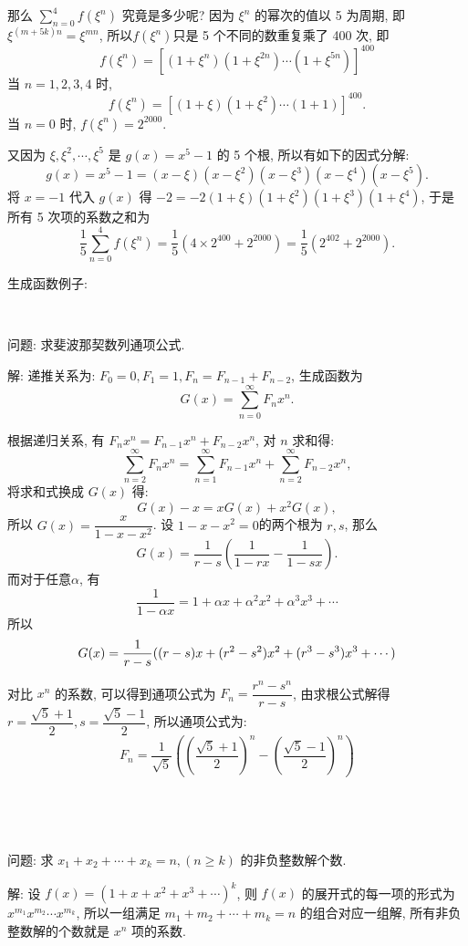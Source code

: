 那么 $\displaystyle \sum_{n=0}^4{f(\xi^n)}$ 究竟是多少呢? 因为 $\xi^n$ 的幂次的值以 5 为周期, 即$\xi^{(m+5k)n}=\xi^{mn}$, 所以$f(\xi^n)$只是 5 个不同的数重复乘了 400 次, 即 
\[f(\xi^n)=\left[(1+\xi^n)(1+\xi^{2n})\cdots(1+\xi^{5n})\right]^{400}\]
当 $n=1,2,3,4$ 时,
\[f(\xi^n) = \left[(1+\xi)(1+\xi^{2})\cdots(1+1)\right]^{400}.\]
当 $n=0$ 时, $f(\xi^n)=2^{2000}$.

又因为 $\xi, \xi^2, \cdots, \xi^5$ 是 $g(x)=x^5-1$ 的 5 个根, 所以有如下的因式分解:
\[g(x) = x^5-1=(x-\xi)(x-\xi^2)(x-\xi^3)(x-\xi^4)(x-\xi^5).\]
将 $x=-1$ 代入 $g(x)$ 得 $-2 = -2(1+\xi)(1+\xi^2)(1+\xi^3)(1+\xi^4)$, 于是所有 5 次项的系数之和为
\[\frac{1}{5}\sum_{n=0}^4{f(\xi^n)}=\frac{1}{5}\left(4\times 2^{400}+2^{2000}\right) = \frac{1}{5}\left(2^{402}+2^{2000}\right).\]


\newpage
\noindent 生成函数例子:

~

\noindent 问题: 求斐波那契数列通项公式.

\noindent 解: 递推关系为: $F_0=0, F_1=1, F_n = F_{n-1} + F_{n-2}$, 生成函数为 
\[
G(x) = \sum_{n=0}^\infty{F_nx^n} .
\]

根据递归关系, 有 $ F_nx^n = F_{n-1}x^n+F_{n-2}x^n $, 对 $n$ 求和得:
\[
\sum_{n=2}^{\infty}{F_nx^n} = \sum_{n=1}^{\infty}{F_{n-1}x^n} + \sum_{n=2}^{\infty}{F_{n-2}x^n} ,
\]
将求和式换成 $G(x)$ 得:
\[
G(x) - x = xG(x) + x^2G(x) ,
\]
所以 $G(x) = \dfrac{x}{1-x-x^2}$. 设 $1-x-x^2=0$的两个根为 $r,s$, 那么
\[
G(x) = \frac{1}{r-s}\left(\frac{1}{1-rx} - \frac{1}{1-sx}\right) .
\]
而对于任意$\alpha$, 有 
\[\frac{1}{1-\alpha x} = 1+\alpha x+\alpha^2x^2 + \alpha^3x^3 + \cdots\]
所以
\[
G(x) = \frac{1}{r-s}((r-s)x + (r^2-s^2)x^2 + (r^3-s^3)x^3 + \cdots) \\
\]

对比 $x^n$ 的系数, 可以得到通项公式为 $F_n = \dfrac{r^n - s^n}{r-s}$, 由求根公式解得 $r=\dfrac{\sqrt{5}+1}{2}, s=\dfrac{\sqrt{5}-1}{2}$, 所以通项公式为:
\[F_n = \frac{1}{\sqrt{5}}\left( \left(\frac{\sqrt{5}+1}{2} \right)^n - \left(\frac{\sqrt{5}-1}{2} \right)^n \right)\]

~

~

问题: 求 $x_1 + x_2 + \cdots + x_k = n, (n\ge k)$ 的非负整数解个数.

解: 设 $f(x) = (1+x+x^2+x^3+\cdots)^k$, 则 $f(x)$ 的展开式的每一项的形式为 $x^{m_1}x^{m_2}\cdots x^{m_k}$, 所以一组满足 $m_1+m_2+\cdots+m_k=n$ 的组合对应一组解, 所有非负整数解的个数就是 $x^n$ 项的系数.

